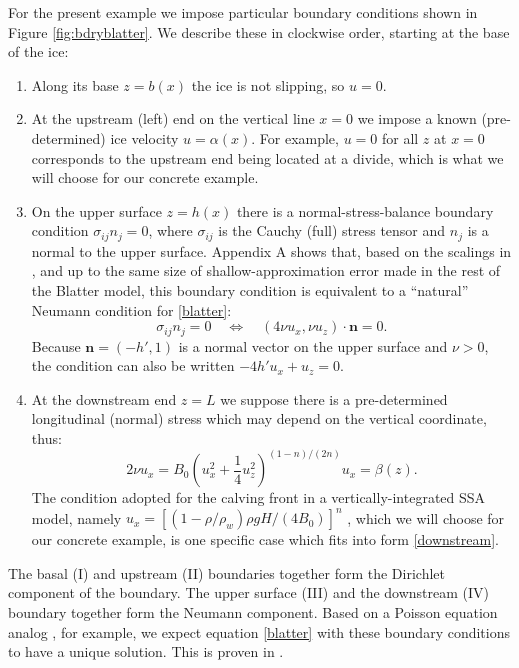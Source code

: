 \documentclass[11pt,final,reqno]{amsart}
\theoremstyle{remark}
\theoremstyle{definition}
\begin{document}
For the present example we impose particular boundary conditions shown in Figure \ref{fig:bdryblatter}.  We describe these in clockwise order, starting at the base of the ice:
\renewcommand{\labelenumi}{\Roman{enumi}.\quad}
\begin{enumerate}
\item Along its base $z=b(x)$ the ice is not slipping, so $u=0$.
\item At the upstream (left) end on the vertical line $x=0$ we impose a known (pre-determined) ice velocity $u=\alpha(x)$.  For example, $u = 0$ for all $z$ at $x=0$ corresponds to the upstream end being located at a divide, which is what we will choose for our concrete example.
\item On the upper surface $z=h(x)$ there is a normal-stress-balance boundary condition $\sigma_{ij} n_j = 0$, where $\sigma_{ij}$ is the Cauchy (full) stress tensor and $n_j$ is a normal to the upper surface.  Appendix A shows that, based on the scalings in \cite{SchoofHindmarsh}, and up to the same size of shallow-approximation error made in the rest of the Blatter model, this boundary condition is equivalent to a ``natural'' Neumann condition for \eqref{blatter}:
\begin{equation}
   \sigma_{ij} n_j = 0 \quad \iff \quad (4 \nu u_x, \nu u_z) \cdot \mathbf{n} = 0. \label{upper}
\end{equation}
Because $\mathbf{n}=(-h',1)$ is a normal vector on the upper surface and $\nu >0$, the condition can also be written $-4 h' u_x + u_z = 0$.
\item At the downstream end $z=L$ we suppose there is a pre-determined longitudinal (normal) stress which may depend on the vertical coordinate, thus:
\begin{equation}
2 \nu u_x = B_0 \left(u_x^2 + \frac{1}{4}u_z^2\right)^{(1-n)/(2n)} u_x = \beta(z). \label{downstream}
\end{equation}
The condition adopted for the calving front in a vertically-integrated SSA model, namely $u_x = [(1 - \rho/\rho_w) \rho g H / (4 B_0) ]^n$ \cite{GreveBlatter2009}, which we will choose for our concrete example, is one specific case which fits into form \eqref{downstream}.
\end{enumerate}

The basal (I) and upstream (II) boundaries together form the Dirichlet component of the boundary.  The upper surface (III) and the downstream (IV) boundary together form the Neumann component.  Based on a Poisson equation analog \cite[i.e.~the equation $u_{xx}+u_{yy}=f$]{Ockendonetal2003}, for example, we expect equation \eqref{blatter} with these boundary conditions to have a unique solution.  This is proven in \cite{RappazReist05,SchoofCoulombBlatter}.
\end{document}
